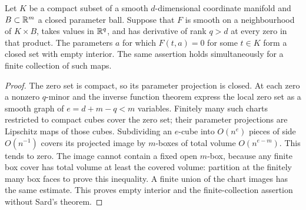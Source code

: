 \begin{lemma}\label{fd:parameter-avoidance}
Let $K$ be a compact subset of a smooth $d$-dimensional coordinate
manifold and $B\subset\mathbb R^m$ a closed parameter ball. Suppose that
$F$ is smooth on a neighbourhood of $K\times B$, takes values in
$\mathbb R^q$, and has derivative of rank $q>d$ at every zero in that product.
The parameters $a$ for which $F(t,a)=0$ for some $t\in K$ form a closed
set with empty interior. The same assertion holds simultaneously for
a finite collection of such maps.
\end{lemma}
\begin{proof}
The zero set is compact, so its parameter projection is closed.
At each zero a nonzero $q$-minor and the inverse function theorem express
the local zero set as a smooth graph of $e=d+m-q<m$ variables.
Finitely many such charts restricted to compact cubes cover the zero
set; their parameter projections are Lipschitz maps of those cubes.
Subdividing an $e$-cube into $O(n^e)$ pieces of side $O(n^{-1})$ covers
its projected image by $m$-boxes of total volume $O(n^{e-m})$.
This tends to zero. The image cannot contain a fixed open $m$-box,
because any finite box cover has total volume at least the covered
volume: partition at the finitely many box faces to prove this inequality.
A finite union of the chart images has the same estimate. This proves
empty interior and the finite-collection assertion without Sard's theorem.
\end{proof}


